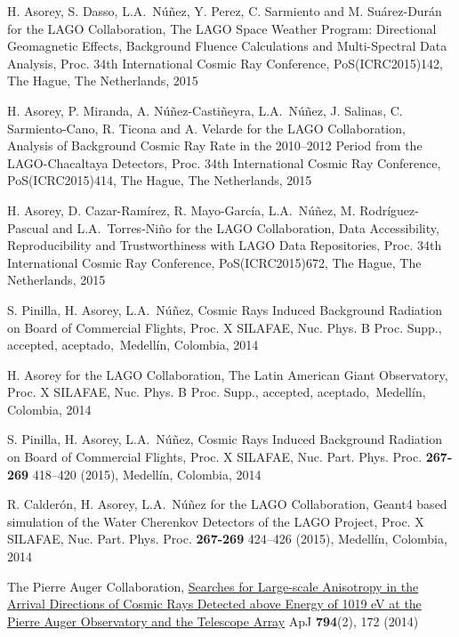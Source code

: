 \begin{etaremune}
\item {}H. Asorey, S. Dasso, L.A.\ Núñez, Y. Perez, C. Sarmiento and M. Suárez-Durán for the LAGO Collaboration, {{The LAGO Space Weather Program: Directional Geomagnetic Effects, Background Fluence Calculations and Multi-Spectral Data Analysis}}, \en Proc.
34th International Cosmic Ray Conference, PoS(ICRC2015)142, The Hague, The Netherlands, 2015

\item {}H. Asorey, P. Miranda, A. Núñez-Castiñeyra, L.A.\ Núñez, J. Salinas, C. Sarmiento-Cano, R. Ticona and A. Velarde for the LAGO Collaboration, {{Analysis of Background Cosmic Ray Rate in the 2010--2012 Period from the LAGO-Chacaltaya Detectors}}, \en Proc.
34th International Cosmic Ray Conference, PoS(ICRC2015)414, The Hague, The Netherlands, 2015

\item {}H. Asorey, D. Cazar-Ramírez, R. Mayo-García, L.A.\ Núñez, M. Rodríguez-Pascual and L.A.\ Torres-Niño for the LAGO Collaboration, {{Data Accessibility, Reproducibility and Trustworthiness with LAGO Data Repositories}}, \en Proc.
34th International Cosmic Ray Conference, PoS(ICRC2015)672, The Hague, The Netherlands, 2015


\item {}S. Pinilla, H. Asorey, L.A.\ Núñez, {{Cosmic Rays Induced Background Radiation on Board of Commercial Flights}}, \en Proc.
X SILAFAE, Nuc.
Phys.
B Proc.
Supp., \ifeng accepted, \else aceptado,\fi\ Medellín, Colombia, 2014

\item {}H. Asorey for the LAGO Collaboration, {{The Latin American Giant Observatory}}, \en Proc.
X SILAFAE, Nuc.
Phys.
B Proc.
Supp., \ifeng accepted, \else aceptado,\fi\ Medellín, Colombia, 2014

\item {}S. Pinilla, H. Asorey, L.A.\ Núñez, {{Cosmic Rays Induced Background Radiation on Board of Commercial Flights}}, \en Proc.
X SILAFAE,  Nuc.
Part.
Phys.
Proc. {\textbf{267-269}} 418--420 (2015), Medellín, Colombia, 2014

\item {}R. Calderón, H. Asorey, L.A.\ Núñez for the LAGO Collaboration, {{Geant4 based simulation of the Water Cherenkov Detectors of the LAGO Project}}, \en Proc.
X SILAFAE, Nuc.
Part.
Phys.
Proc. {\textbf{267-269}} 424--426 (2015), Medellín, Colombia, 2014

\item {}The Pierre Auger Collaboration, \href{http://dx.doi.org/10.1088/0004-637X/794/2/172}{{Searches for Large-scale Anisotropy in the Arrival Directions of Cosmic Rays Detected above Energy of 1019 eV at the Pierre Auger Observatory and the Telescope Array}} ApJ {\textbf{794}}(2), 172 (2014)


\end{etaremune}
